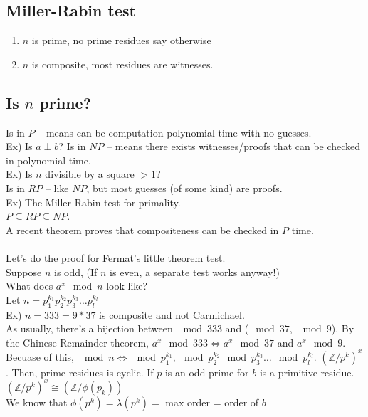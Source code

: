 \documentclass[13pt]{article}
\begin{document}
	\subsection*{Miller-Rabin test}
		\begin{enumerate}
		\item $n$ is prime, no prime residues say otherwise
		\item $n$ is composite, most residues are witnesses.
		\end{enumerate}
	\subsection*{Is $n$ prime?}
		Is in $P$ -- means can be computation polynomial time with no guesses.\\
		Ex) Is $a \perp b$?
		Is in $NP$ -- means there exists witnesses/proofs that can be checked in
		polynomial time.\\
		Ex) Is $n$ divisible by a square $> 1$?\\
		Is in $RP$ -- like $NP$, but most guesses (of some kind) are proofs.\\
		Ex) The Miller-Rabin test for primality.\\
		$P \subseteq RP \subseteq NP$.\\
		A recent theorem proves that compositeness can be checked in $P$ time.\\\\
		Let's do the proof for Fermat's little theorem test.\\
		Suppose $n$ is odd, (If $n$ is even, a separate test works anyway!)\\
		What does $a^x \mod n$ look like?\\
		Let $n = p_1^{k_1}p_2^{k_2}p_3^{k_3}\ldots p_l^{k_l}$\\
		Ex) $n = 333 = 9 * 37$ is composite and not Carmichael.\\
		As usually, there's a bijection between $\mod 333$ and ($\mod 37$, 
		$\mod 9$). By the Chinese Remainder theorem, $a^x \mod 333 \Leftrightarrow
		a^x \mod 37$ and $a^x \mod 9$.\\
		Becuase of this, $\mod n \Leftrightarrow \mod p_1^{k_1}, \mod p_2^{k_2} \mod p_3^{k_3}
		\ldots \mod p_l^{k_l}$. 
		$(\mathbb{Z}/p^k)^x$. Then, prime residues is cyclic. If $p$ is an odd
		prime for $b$ is a primitive residue.\\
		$(\mathbb{Z}/p^k)^x \cong (\mathbb{Z}/\phi(p_k))$\\
		We know that $\phi(p^k) = \lambda(p^k) = $ max order = order of $b$\\
\end{document}
